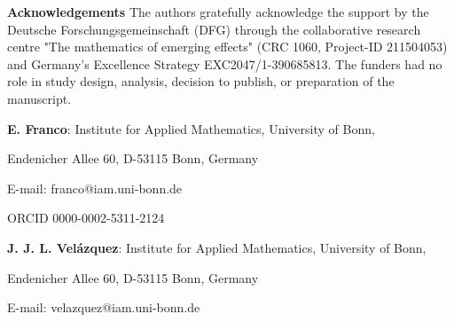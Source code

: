 \documentclass{article}
\numberwithin{equation}{section}
\theoremstyle{plain}
\begin{document}
\bigskip 

\bigskip 

\textbf{Acknowledgements} The authors gratefully acknowledge the support by the Deutsche Forschungsgemeinschaft (DFG) through the collaborative research centre "The mathematics of emerging effects" (CRC 1060, Project-ID 211504053) and Germany's Excellence Strategy EXC2047/1-390685813.
The funders had no role in study design, analysis, decision to publish, or preparation of the manuscript.






\bigskip 

\bigskip 


\textbf{E. Franco}: Institute for Applied Mathematics, University of Bonn,

\hspace{0.5 cm} Endenicher Allee 60, D-53115 Bonn, Germany

\hspace{0.5 cm} E-mail: franco@iam.uni-bonn.de

\hspace{0.5 cm} ORCID 0000-0002-5311-2124

\bigskip 

\textbf{J. J. L. Vel\'azquez}: Institute for Applied Mathematics, University of Bonn,

\hspace{0.5 cm} Endenicher Allee 60, D-53115 Bonn, Germany

\hspace{0.5 cm} E-mail: velazquez@iam.uni-bonn.de




\end{document}
